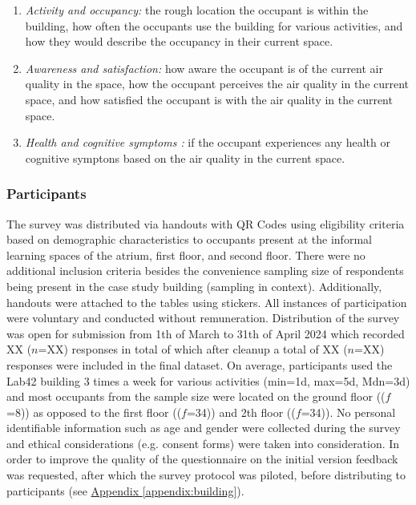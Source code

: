\begin{enumerate}
  \item \textit{Activity and occupancy:} the rough location the occupant is within the building, how often the occupants use the building for various activities, and how they would describe the occupancy in their current space.
  \item \textit{Awareness and satisfaction:} how aware the occupant is of the current air quality in the space, how the occupant perceives the air quality in the current space, and how satisfied the occupant is with the air quality in the current space.
  \item \textit{Health and cognitive symptoms :} if the occupant experiences any health or cognitive symptons based on the air quality in the current space.
\end{enumerate}


\subsubsection{Participants}
The survey was distributed via handouts with QR Codes using eligibility criteria based on demographic characteristics to occupants present at the informal learning spaces of the atrium, first floor, and second floor. There were no additional inclusion criteria besides the convenience sampling size of respondents being present in the case study building (sampling in context). Additionally, handouts were attached to the tables using stickers. All instances of participation were voluntary and conducted without remuneration. Distribution of the survey was open for submission from 1th of March to 31th of April 2024 which recorded XX ($n$=XX) responses in total of which after cleanup a total of XX ($n$=XX) responses were included in the final dataset. On average, participants used the Lab42 building 3 times a week for various activities (min=1d, max=5d, Mdn=3d) and most occupants from the sample size were located on the ground floor (($f$=8)) as opposed to the first floor (($f$=34)) and 2th floor (($f$=34)). No personal identifiable information such as age and gender were collected during the survey and ethical considerations (e.g. consent forms) were taken into consideration. In order to improve the quality of the questionnaire on the initial version feedback was requested, after which the survey protocol was piloted, before distributing to participants (see \hyperref[appendix:building]{Appendix \ref*{appendix:building}}). 


